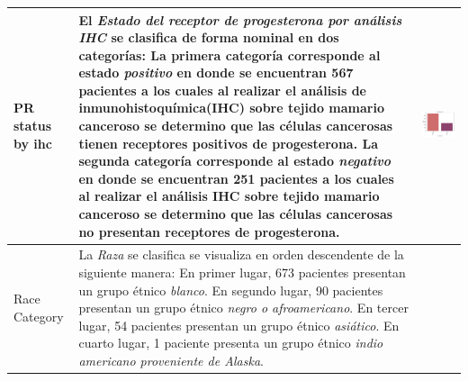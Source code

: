 \begin{table}[!htb]
\begin{threeparttable}
\begin{tabular}{p{2.5cm} p{7cm} p{6.5cm}}
			PR status by ihc
			&El \textit{Estado del receptor de progesterona por análisis IHC} se clasifica de forma nominal en dos categorías: La primera categoría corresponde al estado \textit{positivo} en donde se encuentran 567 pacientes a los cuales al realizar el análisis de inmunohistoquímica(IHC) sobre tejido mamario canceroso se determino que las células cancerosas tienen receptores positivos de progesterona. La segunda categoría corresponde al estado \textit{negativo} en donde se encuentran 251 pacientes a los cuales al realizar el análisis IHC sobre tejido mamario canceroso se determino que las células cancerosas no presentan receptores de progesterona.
			& \begin{center}\includegraphics[width=1\linewidth]{NOTEBOOK/IMAGENES_DESCRIPTIVAS/37_pr_status_ihc}\end{center}
			\\ \hline
			
			Race Category
			& La \textit{Raza} se clasifica se visualiza en orden descendente de la siguiente manera: En primer lugar, 673 pacientes presentan un grupo étnico \textit{blanco}. En segundo lugar, 90 pacientes presentan un grupo étnico \textit{negro o afroamericano}. En tercer lugar, 54 pacientes presentan un grupo étnico \textit{asiático}. En cuarto lugar, 1 paciente presenta un grupo étnico \textit{indio americano proveniente de Alaska}.
			

\end{tabular}
\end{threeparttable}
\end{table}
